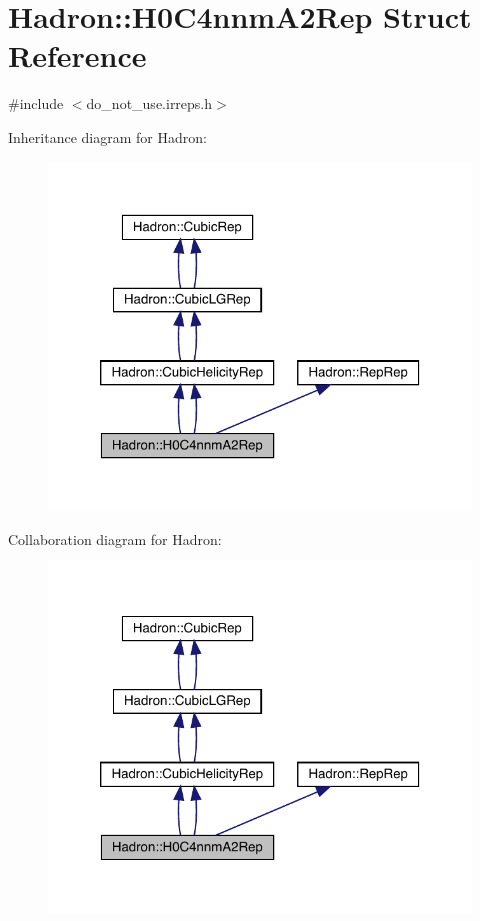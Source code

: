 \hypertarget{structHadron_1_1H0C4nnmA2Rep}{}\section{Hadron\+:\+:H0\+C4nnm\+A2\+Rep Struct Reference}
\label{structHadron_1_1H0C4nnmA2Rep}


{\ttfamily \#include $<$do\+\_\+not\+\_\+use.\+irreps.\+h$>$}



Inheritance diagram for Hadron\+:\nopagebreak
\begin{figure}[H]
\begin{center}
\leavevmode
\includegraphics[width=320pt]{dd/db0/structHadron_1_1H0C4nnmA2Rep__inherit__graph}
\end{center}
\end{figure}


Collaboration diagram for Hadron\+:\nopagebreak
\begin{figure}[H]
\begin{center}
\leavevmode
\includegraphics[width=320pt]{d3/d17/structHadron_1_1H0C4nnmA2Rep__coll__graph}
\end{center}
\end{figure}
